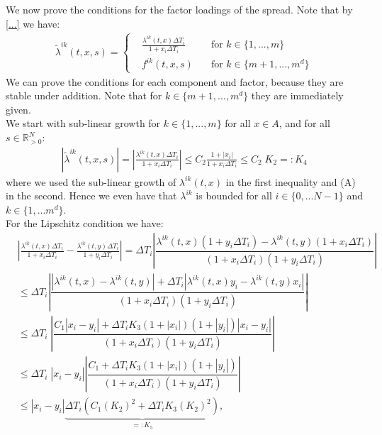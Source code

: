 \documentclass[12pt]{article}
\begin{document}
We now prove the conditions for the factor loadings of the spread. Note that by \cref{...} we have:
\begin{align*}
	\tilde{\lambda}^{i k}\left(t,x, s\right) = 
	\left\{
	\begin{aligned}
		&\frac{\lambda^{i k}(t,x) \Delta T_i}{1 + x_i\Delta T_i} \quad &\text{for } k \in \{1,...,m\}\\
		&f^{i k}(t,x,s) \quad &\text{for } k \in \{m+1,...,m^d\}
	\end{aligned}
	\right.
\end{align*}
We can prove the conditions for each component and factor, because they are stable under addition. Note that for $k\in\{m+1, ..., m^d\}$ they are immediately given.\\
We start with sub-linear growth for $k\in\{1,...,m\}$ for all $x \in A$, and for all $s\in \mathbb{R}_{>0}^N$:
\begin{align*}
	\left|\tilde{\lambda}^{i k}\left(t,x, s\right)\right| = \left|\frac{\lambda^{i k}(t,x) \Delta T_i}{1 + x_i\Delta T_i}\right|\le C_2 \frac{1+|x_i|}{1+x_i\Delta T_i}\le C_2\;K_2=:K_4\tag{C}
\end{align*}
where we used the sub-linear growth of $\lambda^{ik}(t,x)$ in the first inequality and (A) in the second. Hence we even have that $\lambda^{ik}$ is bounded for all $i\in\{0,...N-1\}$ and $k\in\{1,...m^d\}$.\\
For the Lipschitz condition we have:
\begin{align*}
	&\left|\frac{\lambda^{i k}(t,x) \Delta T_i}{1 + x_i\Delta T_i} - \frac{\lambda^{i k}(t,y) \Delta T_i}{1 + y_i\Delta T_i}\right| =
	\Delta T_i \left|\dfrac{\lambda^{i k}(t,x)\left(1 + y_i\Delta T_i\right) - \lambda^{i k}(t,y)\left(1 + x_i\Delta T_i\right)}{\left(1 + x_i\Delta T_i\right)\left(1 + y_i\Delta T_i\right)}\right|\\
	&\le \Delta T_i \left|\dfrac{\left|\lambda^{i k}(t,x) - \lambda^{i k}(t,y)\right| + \Delta T_i \left|\lambda^{i k}(t,x) y_i - \lambda^{i k}(t,y)x_i\right|}{\left(1 + x_i\Delta T_i\right)\left(1 + y_i\Delta T_i\right)}\right|\tag{D}\\
	&\le \Delta T_i \;\left|\dfrac{C_1\left|x_i - y_i\right| + \Delta T_i K_3 \left(1 + \left|x_i\right|\right)\left( 1 +\left| y_i \right| \right) \left|x_i - y_i\right|}{\left(1 + x_i\Delta T_i\right)\left(1 + y_i\Delta T_i\right)}\right|\tag{E}\\
	&\le \Delta T_i \;\left|x_i - y_i\right|\left|\dfrac{C_1 + \Delta T_i K_3 \left(1 + \left|x_i\right|\right) \left( 1 +\left| y_i \right| \right)}{\left(1 + x_i\Delta T_i\right)\left(1 + y_i\Delta T_i\right)}\right|\tag{F}\\
	&\le \left|x_i - y_i\right| \underbrace{\Delta T_i \left(C_1 \left(K_2\right)^2 +\Delta T_i  K_3 \left(K_2\right)^2\right)}_{=:K_5},\tag{G}
\end{align*}
\end{document}
